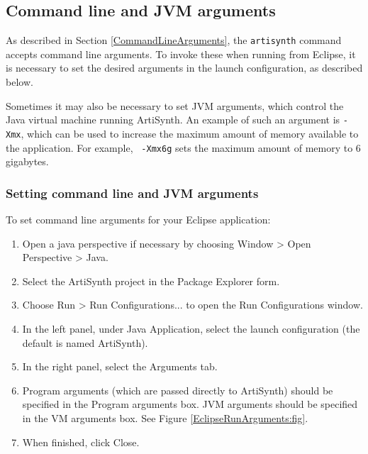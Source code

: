 \subsection{Command line and JVM arguments}
\label{EclipseCommandArguments}

As described in Section \ref{CommandLineArguments}, the {\tt artisynth}
command accepts command line arguments. To invoke these when
running from Eclipse, it is necessary to set the desired arguments in
the launch configuration, as described below. 

Sometimes it may also be necessary to set JVM arguments, which control
the Java virtual machine running ArtiSynth.  An example of such an
argument is {\tt -Xmx}, which can be used to increase the maximum
amount of memory available to the application.  For example, {\tt
-Xmx6g} sets the maximum amount of memory to 6 gigabytes.

\subsubsection {Setting command line and JVM arguments}
\label{SettingCommandLineArguments}

To set command line arguments for your Eclipse application:

\begin{enumerate}

\item Open a java perspective if necessary by choosing
  {\sf Window > Open Perspective > Java}.

\item Select the ArtiSynth project in the {\sf Package Explorer} form.

\item Choose {\sf Run > Run Configurations...} to open the {\sf Run
  Configurations} window.

\item In the left panel, under {\sf Java Application}, select
the launch configuration (the default is named {\sf ArtiSynth}).

\item In the right panel, select the {\sf Arguments} tab.

\item Program arguments (which are passed directly to ArtiSynth)
should be specified in the {\sf Program arguments} box.  JVM arguments
should be specified in the {\sf VM arguments} box. See Figure
\ref{EclipseRunArguments:fig}.

\item When finished, click {\sf Close}.

\end{enumerate}

